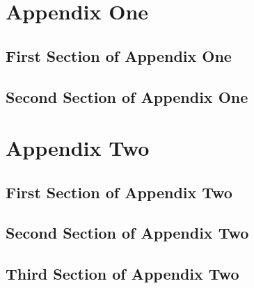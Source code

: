 \chapter{Appendix One}
\section{First Section of Appendix One}
\section{Second Section of Appendix One}

\chapter{Appendix Two}
\section{First Section of Appendix Two}
\section{Second Section of Appendix Two}
\section{Third Section of Appendix Two}